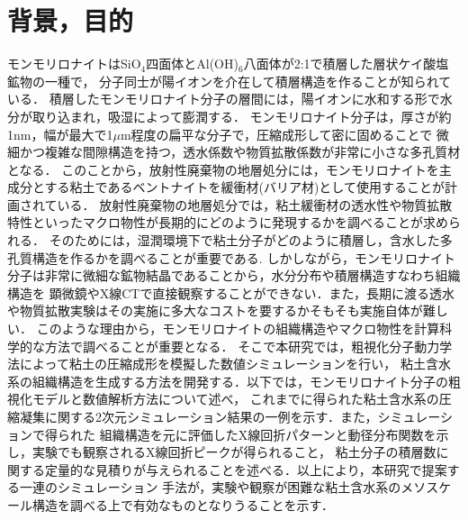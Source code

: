 ﻿\documentclass[11pt,a4j]{jarticle}
\begin{document}
\section{背景，目的}
モンモリロナイトはSiO$_4$四面体とAl(OH)$_6$八面体が2:1で積層した層状ケイ酸塩鉱物の一種で，
分子同士が陽イオンを介在して積層構造を作ることが知られている．
積層したモンモリロナイト分子の層間には，陽イオンに水和する形で水分が取り込まれ，吸湿によって膨潤する．
モンモリロナイト分子は，厚さが約1nm，幅が最大で1$\mu$m程度の扁平な分子で，圧縮成形して密に固めることで
微細かつ複雑な間隙構造を持つ，透水係数や物質拡散係数が非常に小さな多孔質材となる．
このことから，放射性廃棄物の地層処分には，モンモリロナイトを主成分とする粘土であるベントナイトを緩衝材(バリア材)として使用することが計画されている．
放射性廃棄物の地層処分では，粘土緩衝材の透水性や物質拡散特性といったマクロ物性が長期的にどのように発現するかを調べることが求められる．
そのためには，湿潤環境下で粘土分子がどのように積層し，含水した多孔質構造を作るかを調べることが重要である.
しかしながら，モンモリロナイト分子は非常に微細な鉱物結晶であることから，水分分布や積層構造すなわち組織構造を
顕微鏡やX線CTで直接観察することができない．また，長期に渡る透水や物質拡散実験はその実施に多大なコストを要するかそもそも実施自体が難しい．
このような理由から，モンモリロナイトの組織構造やマクロ物性を計算科学的な方法で調べることが重要となる．
そこで本研究では，粗視化分子動力学法によって粘土の圧縮成形を模擬した数値シミュレーションを行い，
粘土含水系の組織構造を生成する方法を開発する．以下では，モンモリロナイト分子の粗視化モデルと数値解析方法について述べ，
これまでに得られた粘土含水系の圧縮凝集に関する2次元シミュレーション結果の一例を示す．また，シミュレーションで得られた
組織構造を元に評価したX線回折パターンと動径分布関数を示し，実験でも観察されるX線回折ピークが得られること，
粘土分子の積層数に関する定量的な見積りが与えられることを述べる．以上により，本研究で提案する一連のシミュレーション
手法が，実験や観察が困難な粘土含水系のメソスケール構造を調べる上で有効なものとなりうることを示す．
\end{document}
